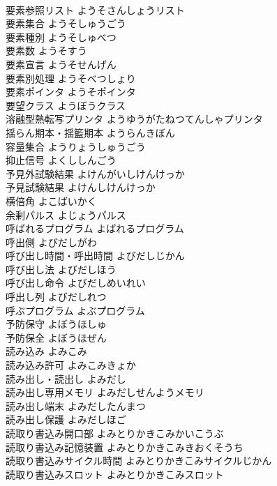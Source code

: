 \documentclass[8pt]{extreport}
\begin{document}
\begin{CJK}{UTF8}{min}
\\	要素参照リスト	ようそさんしょうリスト	
\\	要素集合	ようそしゅうごう	
\\	要素種別	ようそしゅべつ	
\\	要素数	ようそすう	
\\	要素宣言	ようそせんげん	
\\	要素別処理	ようそべつしょり	
\\	要素ポインタ	ようそポインタ	
\\	要望クラス	ようぼうクラス	
\\	溶融型熱転写プリンタ	ようゆうがたねつてんしゃプリンタ	
\\	揺らん期本・揺籃期本	ようらんきぼん	
\\	容量集合	ようりょうしゅうごう	
\\	抑止信号	よくししんごう	
\\	予見外試験結果	よけんがいしけんけっか	
\\	予見試験結果	よけんしけんけっか	
\\	横倍角	よこばいかく	
\\	余剰パルス	よじょうパルス	
\\	呼ばれるプログラム	よばれるプログラム	
\\	呼出側	よびだしがわ	
\\	呼び出し時間・呼出時間	よびだしじかん	
\\	呼び出し法	よびだしほう	
\\	呼び出し命令	よびだしめいれい	
\\	呼出し列	よびだしれつ	
\\	呼ぶプログラム	よぶプログラム	
\\	予防保守	よぼうほしゅ	
\\	予防保全	よぼうほぜん	
\\	読み込み	よみこみ	
\\	読み込み許可	よみこみきょか	
\\	読み出し・読出し	よみだし	
\\	読み出し専用メモリ	よみだしせんようメモリ	
\\	読み出し端末	よみだしたんまつ	
\\	読み出し保護	よみだしほご	
\\	読取り書込み開口部	よみとりかきこみかいこうぶ	
\\	読取り書込み記憶装置	よみとりかきこみきおくそうち	
\\	読取り書込みサイクル時間	よみとりかきこみサイクルじかん	
\\	読取り書込みスロット	よみとりかきこみスロット	

\end{CJK}
\end{document}
